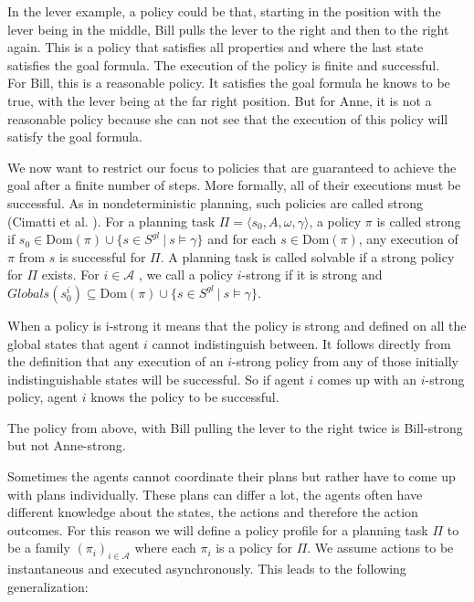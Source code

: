
In the lever example, a policy could be that, starting in the position with the lever being in the middle, Bill pulls the lever to the right and then to the right again. This is a policy that satisfies all properties and where the last state satisfies the goal formula. The execution of the policy is finite and successful. \\
For Bill, this is a reasonable policy. It satisfies the goal formula he knows to be true, with the lever being at the far right position. But for Anne, it is not a reasonable policy because she can not see that the execution of this policy will satisfy the goal formula.

We now want to restrict our focus to policies that are guaranteed to achieve the goal after a finite number of steps. More formally, all of their executions must be successful. As in nondeterministic planning, such policies are called strong (Cimatti et al. \cite{cimattietal}).
For a planning task $\Pi = \langle s_0, A, \omega, \gamma \rangle$, a policy $\pi$ is called strong if $s_0 \in \text{Dom}(\pi) \cup \{s \in S^{gl} ~|~ s \models \gamma\}$ and for each $s \in \text{Dom}(\pi)$, any execution of $\pi$ from $s$ is successful for $\Pi$. A planning task is called solvable if a strong policy for $\Pi$ exists.
For $ i \in \mathcal{A} $ , we call a policy $i$-strong if it is strong and  $Globals(s_0^i ) \subseteq \text{Dom}(\pi) \cup\{ s \in S^{gl} ~|~ s \models \gamma \}$.

When a policy is i-strong it means that the policy is strong and defined on all the global states that agent $i$ cannot indistinguish between. It follows directly from the definition that any execution of an $i$-strong policy from any of those initially indistinguishable states will be successful. So if agent $i$ comes up with an $i$-strong policy, agent $i$ knows the policy to be successful.

The policy from above, with Bill pulling the lever to the right twice is Bill-strong but not Anne-strong.

Sometimes the agents cannot coordinate their plans but rather have to come up with plans individually. These plans can differ a lot, the agents often have different knowledge about the states, the actions and therefore the action outcomes. For this reason we will define a policy profile for a planning task $\Pi$ to be a family $(\pi_i)_{i \in \mathcal{A}}$ where each $\pi_i$ is a policy for $\Pi$. We assume actions to be instantaneous and executed asynchronously. This leads to the following generalization:

